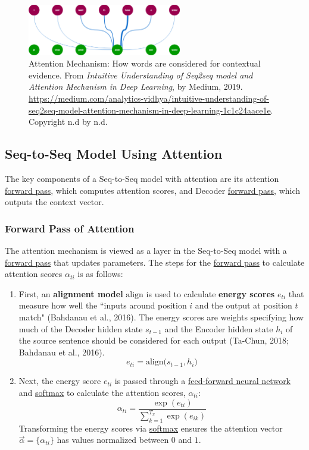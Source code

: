 \begin{figure}[h]
\centering
\includegraphics[width=0.6\textwidth]{imgs/attention.png}
\caption{\footnotesize Attention Mechanism: How words are considered for contextual evidence. From \emph{Intuitive Understanding of Seq2seq model and Attention Mechanism in Deep Learning}, by Medium, 2019. \url{https://medium.com/analytics-vidhya/intuitive-understanding-of-seq2seq-model-attention-mechanism-in-deep-learning-1c1c24aace1e}. Copyright n.d by n.d.}
\label{fig:attention}
\end{figure}

\subsection{Seq-to-Seq Model Using Attention}

The key components of a Seq-to-Seq model with attention are its attention \hyperref[sec:ForwardProp]{forward pass}, which computes attention scores, and Decoder \hyperref[sec:ForwardProp]{forward pass}, which outputs the context vector. 

\subsubsection{Forward Pass of Attention}

The attention mechanism is viewed as a layer in the Seq-to-Seq model with a \hyperref[sec:ForwardProp]{forward pass} that updates parameters. The steps for the \hyperref[sec:ForwardProp]{forward pass} to calculate attention scores $\alpha_{ti}$ is as follows: 
\begin{enumerate}
    \item First, an \textbf{alignment model} $\text{align}$ is used to calculate \textbf{energy scores} $e_{ti}$ that measure how well the ``inputs around position $i$ and the output at position $t$ match" (Bahdanau et al., 2016). The energy scores are weights specifying how much of the Decoder hidden state $s_{t-1}$ and the Encoder hidden state $h_i$ of the source sentence should be considered for each output (Ta-Chun, 2018; Bahdanau et al., 2016). 
    $$
    e_{ti} = \text{align} \Big(s_{t-1}, h_i \Big)
    $$ 
    
    \item Next, the energy score $e_{ti}$ is passed through a \hyperref[sec:NeuralLM]{feed-forward neural network} and \hyperref[cnc:softmaxLayer]{softmax} to calculate the attention scores, $\alpha_{ti}$:
    $$
    \alpha_{ti} = \frac{\exp{(e_{ti})} } { \sum_{k=1}^{T_x} \exp{(e_{ik})} }
    $$
    Transforming the energy scores via \hyperref[cnc:softmaxLayer]{softmax} ensures the attention vector $\overrightarrow{\alpha} = \Big \{ \alpha_{ti} \Big \}$ has values normalized between $0$ and $1$. 
\end{enumerate}

